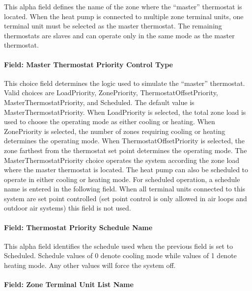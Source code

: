 This alpha field defines the name of the zone where the ``master'' thermostat is located. When the heat pump is connected to multiple zone terminal units, one terminal unit must be selected as the master thermostat. The remaining thermostats are slaves and can operate only in the same mode as the master thermostat.

\paragraph{Field: Master Thermostat Priority Control Type}\label{field-master-thermostat-priority-control-type-000}

This choice field determines the logic used to simulate the ``master'' thermostat. Valid choices are LoadPriority, ZonePriority, ThermostatOffsetPriority, MasterThermostatPriority, and Scheduled. The default value is MasterThermostatPriority. When LoadPriority is selected, the total zone load is used to choose the operating mode as either cooling or heating. When ZonePriority is selected, the number of zones requiring cooling or heating determines the operating mode. When ThermostatOffsetPriority is selected, the zone farthest from the thermostat set point determines the operating mode. The MasterThermostatPriority choice operates the system according the zone load where the master thermostat is located. The heat pump can also be scheduled to operate in either cooling or heating mode. For scheduled operation, a schedule name is entered in the following field. When all terminal units connected to this system are set point controlled (set point control is only allowed in air loops and outdoor air systems) this field is not used.

\paragraph{Field: Thermostat Priority Schedule Name}\label{field-thermostat-priority-schedule-name-000}

This alpha field identifies the schedule used when the previous field is set to Scheduled. Schedule values of 0 denote cooling mode while values of 1 denote heating mode. Any other values will force the system off.

\paragraph{Field: Zone Terminal Unit List Name}\label{field-zone-terminal-unit-list-name}

